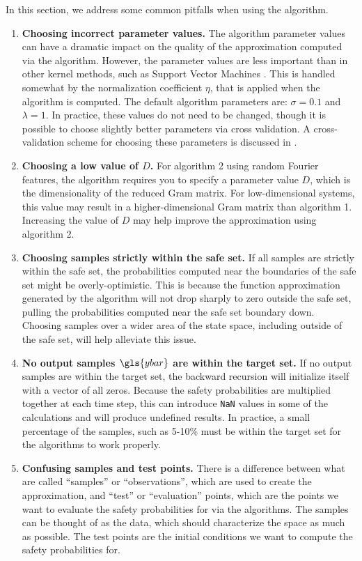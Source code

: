 \documentclass[11pt]{article}
\begin{document}
In this section, we address some common pitfalls when using the algorithm.

\begin{enumerate}
  \item
  \textbf{Choosing incorrect parameter values.} The algorithm parameter values
  can have a dramatic impact on the quality of the approximation computed via
  the algorithm. However, the parameter values are less important than in other
  kernel methods, such as Support Vector Machines \cite{vapnik}. This is handled
  somewhat by the normalization coefficient $\eta$, that is applied when the
  algorithm is computed. The default algorithm parameters are: $\sigma = 0.1$
  and $\lambda = 1$. In practice, these values do not need to be changed, though
  it is possible to choose slightly better parameters via cross validation. A
  cross-validation scheme for choosing these parameters is discussed in
  \cite{michelli}.

  \item
  \textbf{Choosing a low value of $D$.} For algorithm 2 using random Fourier features, the algorithm requires you to specify a parameter value $D$, which is the dimensionality of the reduced Gram matrix. For low-dimensional systems, this value may result in a higher-dimensional Gram matrix than algorithm 1. Increasing the value of $D$ may help improve the approximation using algorithm 2.

  \item
  \textbf{Choosing samples strictly within the safe set.} If all samples are
  strictly within the safe set, the probabilities computed near the boundaries
  of the safe set might be overly-optimistic. This is because the function
  approximation generated by the algorithm will not drop sharply to zero outside
  the safe set, pulling the probabilities computed near the safe set boundary
  down. Choosing samples over a wider area of the state space, including outside
  of the safe set, will help alleviate this issue.

  \item
  \textbf{No output samples $\gls{ybar}$ are within the target set.} If no
  output samples are within the target set, the backward recursion will
  initialize itself with a vector of all zeros. Because the safety probabilities
  are multiplied together at each time step, this can introduce \verb|NaN|
  values in some of the calculations and will produce undefined results. In
  practice, a small percentage of the samples, such as 5-10\% must be within the
  target set for the algorithms to work properly.

  \item
  \textbf{Confusing samples and test points.} There is a difference between what are called ``samples'' or ``observations'', which are used to create the approximation, and ``test'' or ``evaluation'' points, which are the points we want to evaluate the safety probabilities for via the algorithms. The samples can be thought of as the data, which should characterize the space as much as possible. The test points are the initial conditions we want to compute the safety probabilities for.
\end{enumerate}
\end{document}
